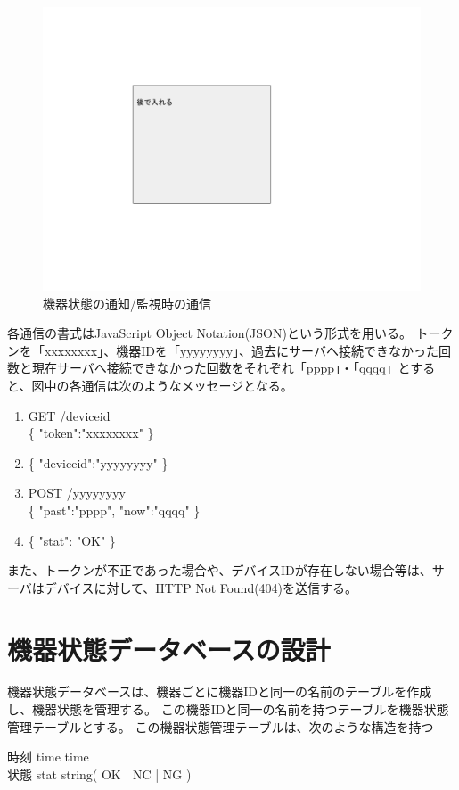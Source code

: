 \begin{figure}[htbp]
\includegraphics[width=16cm]{images/test.png}
\caption{機器状態の通知/監視時の通信}
\label{fig:blockdiagram}
\end{figure}

各通信の書式はJavaScript Object Notation(JSON)という形式を用いる。
トークンを「xxxxxxxx」、機器IDを「yyyyyyyy」、過去にサーバへ接続できなかった回数と現在サーバへ接続できなかった回数をそれぞれ「pppp」・「qqqq」とすると、図中の各通信は次のようなメッセージとなる。
\begin{enumerate}
\item GET /deviceid\\
	\{ "token":"xxxxxxxx" \}
\item \{ "deviceid":"yyyyyyyy" \}
\item POST /yyyyyyyy\\
	\{ "past":"pppp", "now":"qqqq" \}
\item \{ "stat": "OK" \}
\end{enumerate}
また、トークンが不正であった場合や、デバイスIDが存在しない場合等は、サーバはデバイスに対して、HTTP Not Found(404)を送信する。


\section{機器状態データベースの設計}
機器状態データベースは、機器ごとに機器IDと同一の名前のテーブルを作成し、機器状態を管理する。
この機器IDと同一の名前を持つテーブルを機器状態管理テーブルとする。
この機器状態管理テーブルは、次のような構造を持つ

時刻 time time\\
状態 stat string( OK | NC | NG )\\


